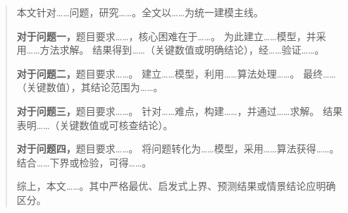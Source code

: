 
\begin{abstract}


本文针对……问题，研究……。全文以……为统一建模主线。

\textbf{对于问题一，}题目要求……，核心困难在于……。
为此建立……模型，并采用……方法求解。
结果得到……（关键数值或明确结论），经……验证……。

\textbf{对于问题二，}题目要求……。
建立……模型，利用……算法处理……。
最终……（关键数值），其结论范围为……。

\textbf{对于问题三，}题目要求……。
针对……难点，构建……，并通过……求解。
结果表明……（关键数值或可核查结论）。

\textbf{对于问题四，}题目要求……。
将问题转化为……模型，采用……算法获得……。
结合……下界或检验，可得……。

综上，本文……。其中严格最优、启发式上界、预测结果或情景结论应明确区分。


\end{abstract}

